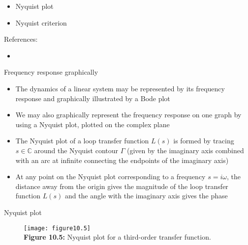 \documentclass{beamer-control}
\begin{document}

\begin{SUMMARY}
\begin{itemize}
\item Nyquist plot
\item Nyquist criterion
\end{itemize}
\vfill References:
\begin{itemize}
\item {}
\end{itemize}
\end{SUMMARY}




\begin{frame}{Frequency response graphically}
\begin{itemize}
\item The dynamics of a linear system may be represented by its frequency response and graphically illustrated by a Bode plot
\item We may also graphically represent the frequency response on one graph by using a Nyquist plot, plotted on the complex plane
\item The Nyquist plot of a loop transfer function $L(s)$ is formed by tracing $s\in\mathbb{C}$ around the Nyquist contour $\Gamma$ (given by the imaginary axis combined with an arc at infinite connecting the endpoints of the imaginary axis)
\item At any point on the Nyquist plot corresponding to a frequency $s=i\omega$, the distance away from the origin gives the magnitude of the loop transfer function $L(s)$ and the angle with the imaginary axis gives the phase
\end{itemize}
\end{frame}


\begin{frame}{Nyquist plot}
\begin{figure}
	\centering
	\texttt{[image: figure10.5]}
	\\
	\textbf{Figure 10.5:} Nyquist plot for a third-order transfer function.
\end{figure}
\end{frame}


\end{document}
